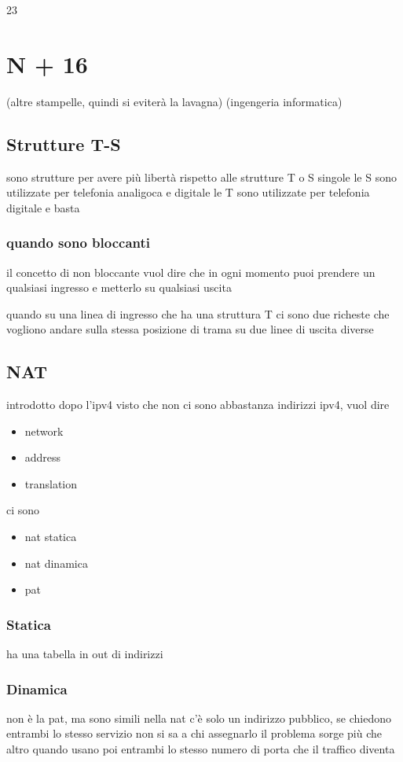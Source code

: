 \documentclass[11pt]{article}
\begin{document}
23

\section{N + 16}
\label{sec:orgf3083dd}
(altre stampelle, quindi si eviterà la lavagna)
(ingengeria informatica)
\subsection{Strutture T-S}
\label{sec:orgfa802dd}
sono strutture per avere più libertà rispetto alle strutture T o S singole
le S sono utilizzate per telefonia analigoca e digitale
le T sono utilizzate per telefonia digitale e basta
\subsubsection{quando sono bloccanti}
\label{sec:org81d15d8}
il concetto di non bloccante vuol dire che in ogni momento puoi prendere un qualsiasi ingresso e metterlo su qualsiasi uscita

quando su una linea di ingresso che ha una struttura T ci sono due richeste che vogliono andare sulla stessa posizione di trama su due linee di uscita diverse

\subsection{NAT}
\label{sec:orgdf8dc92}
introdotto dopo l'ipv4 visto che non ci sono abbastanza indirizzi ipv4, vuol dire
\begin{itemize}
\item network
\item address
\item translation
\end{itemize}

ci sono
\begin{itemize}
\item nat statica
\item nat dinamica
\item pat
\end{itemize}

\subsubsection{Statica}
\label{sec:orge19e8af}
ha una tabella in out di indirizzi 

\subsubsection{Dinamica}
\label{sec:org5c533c9}
non è la pat, ma sono simili
nella nat c'è solo un indirizzo pubblico, se chiedono entrambi lo stesso servizio non si sa a chi assegnarlo
il problema sorge più che altro quando usano poi entrambi lo stesso numero di porta che il traffico diventa 
\end{document}
